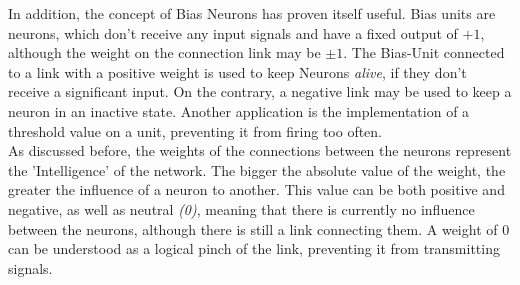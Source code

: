 \documentclass[10pt,a4paper,DIV=11]{scrreprt}
\begin{document}
In addition, the concept of Bias Neurons has proven itself useful. Bias units are neurons, which don't receive any input signals and have a fixed output of $+ 1$, although the weight on the connection link may be $\pm 1$. The Bias-Unit connected to a link with a positive weight is used to keep Neurons \textit{alive}, if they don't receive a significant input. On the contrary, a negative link may be used to keep a neuron in an inactive state.
Another application is the implementation of a threshold value on a unit, preventing it from firing too often.\\ 

As discussed before, the weights of the connections between the neurons represent the 'Intelligence' of the network. The bigger the absolute value of the weight, the greater the influence of a neuron to another. This value can be both positive and negative, as well as neutral \textit{(0)}, meaning that there is currently no influence between the neurons, although there is still a link connecting them. A weight of 0 can be understood as a logical pinch of the link, preventing it from transmitting signals.
\end{document}
